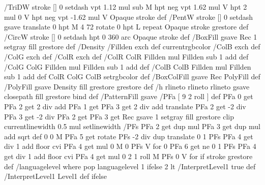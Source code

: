 /TriDW {stroke [] 0 setdash vpt 1.12 mul sub M
  hpt neg vpt 1.62 mul V
  hpt 2 mul 0 V
  hpt neg vpt -1.62 mul V Opaque stroke} def
/PentW {stroke [] 0 setdash gsave
  translate 0 hpt M 4 {72 rotate 0 hpt L} repeat
  Opaque stroke grestore} def
/CircW {stroke [] 0 setdash 
  hpt 0 360 arc Opaque stroke} def
/BoxFill {gsave Rec 1 setgray fill grestore} def
/Density {
  /Fillden exch def
  currentrgbcolor
  /ColB exch def /ColG exch def /ColR exch def
  /ColR ColR Fillden mul Fillden sub 1 add def
  /ColG ColG Fillden mul Fillden sub 1 add def
  /ColB ColB Fillden mul Fillden sub 1 add def
  ColR ColG ColB setrgbcolor} def
/BoxColFill {gsave Rec PolyFill} def
/PolyFill {gsave Density fill grestore grestore} def
/h {rlineto rlineto rlineto gsave closepath fill grestore} bind def
%
%
/PatternFill {gsave /PFa [ 9 2 roll ] def
  PFa 0 get PFa 2 get 2 div add PFa 1 get PFa 3 get 2 div add translate
  PFa 2 get -2 div PFa 3 get -2 div PFa 2 get PFa 3 get Rec
  gsave 1 setgray fill grestore clip
  currentlinewidth 0.5 mul setlinewidth
  /PFs PFa 2 get dup mul PFa 3 get dup mul add sqrt def
  0 0 M PFa 5 get rotate PFs -2 div dup translate
  0 1 PFs PFa 4 get div 1 add floor cvi
	{PFa 4 get mul 0 M 0 PFs V} for
  0 PFa 6 get ne {
	0 1 PFs PFa 4 get div 1 add floor cvi
	{PFa 4 get mul 0 2 1 roll M PFs 0 V} for
 } if
  stroke grestore} def
%
/languagelevel where
 {pop languagelevel} {1} ifelse
 2 lt
	{/InterpretLevel1 true def}
	{/InterpretLevel1 Level1 def}
 ifelse
%
%
